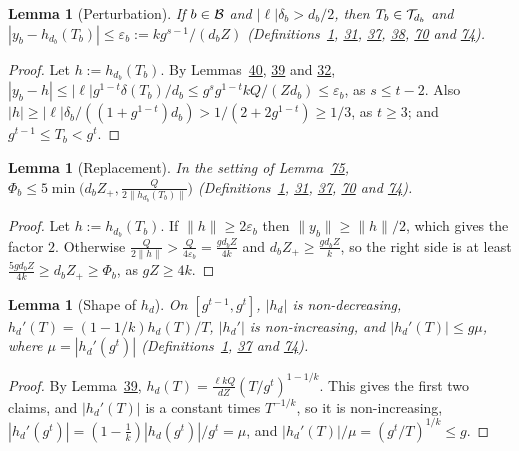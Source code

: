 \documentclass[11pt]{article}
\newcounter{hffc}
\theoremstyle{definition}\newtheorem{hffdef}[hffc]{Definition}
\theoremstyle{plain}\newtheorem{hfflem}[hffc]{Lemma}\newtheorem{hffthm}[hffc]{Theorem}
\theoremstyle{remark}\newtheorem{hffrem}[hffc]{Remark}
\newcommand{\hffcost}{}
\newcommand{\setcost}[1]{\renewcommand{\hffcost}{#1}}
\begin{document}
\begin{hfflem}[Perturbation]\label{L:pert}
If $b\in\mathcal{B}$ and $|\ell|\delta_b>d_b/2$, then $T_b\in\mathcal{T}_{d_b}$ and $|y_b-h_{d_b}(T_b)|\le\varepsilon_b:=kg^{s-1}/(d_bZ)$ (Definitions~\hyperref[D:conv]{1}, \hyperref[D:node]{31}, \hyperref[D:phase]{37}, \hyperref[D:arch]{38}, \hyperref[D:count]{70} and \hyperref[D:curve]{74}).
\par\nopagebreak{}
\end{hfflem}
\begin{proof}\setcost{length 145/300}Let $h:=h_{d_b}(T_b)$. By Lemmas~\hyperref[L:deltab]{40}, \hyperref[L:delta]{39} and \hyperref[L:lead]{32}, $|y_b-h|\le|\ell|g^{1-t}\delta(T_b)/d_b\le g^sg^{1-t}kQ/(Zd_b)\le\varepsilon_b$, as $s\le t-2$. Also $|h|\ge|\ell|\delta_b/((1+g^{1-t})d_b)>1/(2+2g^{1-t})\ge1/3$, as $t\ge3$; and $g^{t-1}\le T_b<g^t$.
\end{proof}

\begin{hfflem}[Replacement]\label{L:repl}
In the setting of Lemma~\hyperref[L:pert]{75}, $\Phi_b\le5\min\bigl(d_bZ_+,\frac Q{2\|h_{d_b}(T_b)\|}\bigr)$ (Definitions~\hyperref[D:conv]{1}, \hyperref[D:node]{31}, \hyperref[D:phase]{37}, \hyperref[D:count]{70} and \hyperref[D:curve]{74}).
\par\nopagebreak{}
\end{hfflem}
\begin{proof}\setcost{length 146/300}Let $h:=h_{d_b}(T_b)$. If $\|h\|\ge2\varepsilon_b$ then $\|y_b\|\ge\|h\|/2$, which gives the factor $2$. Otherwise $\frac Q{2\|h\|}>\frac Q{4\varepsilon_b}=\frac{gd_bZ}{4k}$ and $d_bZ_+\ge\frac{gd_bZ}k$, so the right side is at least $\frac{5gd_bZ}{4k}\ge d_bZ_+\ge\Phi_b$, as $gZ\ge4k$.
\end{proof}

\begin{hfflem}[Shape of $h_d$]\label{L:shape}
On $[g^{t-1},g^t]$, $|h_d|$ is non-decreasing, $h_d'(T)=(1-1/k)h_d(T)/T$, $|h_d'|$ is non-increasing, and $|h_d'(T)|\le g\mu$, where $\mu=|h_d'(g^t)|$ (Definitions~\hyperref[D:conv]{1}, \hyperref[D:phase]{37} and \hyperref[D:curve]{74}).
\par\nopagebreak{}
\end{hfflem}
\begin{proof}\setcost{length 170/300}By Lemma~\hyperref[L:delta]{39}, $h_d(T)=\frac{\ell kQ}{dZ}(T/g^t)^{1-1/k}$. This gives the first two claims, and $|h_d'(T)|$ is a constant times $T^{-1/k}$, so it is non-increasing, $|h_d'(g^t)|=(1-\frac1k)|h_d(g^t)|/g^t=\mu$, and $|h_d'(T)|/\mu=(g^t/T)^{1/k}\le g$.
\end{proof}
\end{document}
